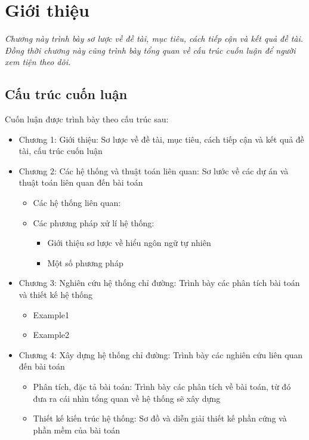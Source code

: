 \chapter{Giới thiệu}
\label{Chapter1}

\emph{Chương này trình bày sơ lược về đề tài, mục tiêu, cách tiếp cận và kết quả đề tài. Đồng thời chương này cũng trình bày tổng quan về cấu trúc cuốn luận để người xem tiện theo dõi.}
\section{Cấu trúc cuốn luận}
Cuốn luận được trình bày theo cấu trúc sau:
\begin{itemize}
    \item Chương 1: Giới thiệu: Sơ lược về đề tài, mục tiêu, cách tiếp cận và kết quả đề tài, cấu trúc cuốn luận
    \item Chương 2: Các hệ thống và thuật toán liên quan: Sơ lước về các dự án và thuật toán liên quan đến bài toán
          \begin{itemize}
              \item Các hệ thống liên quan:
              \item Các phương pháp xử lí hệ thống:
                    \begin{itemize}
                        \item Giới thiệu sơ lược về hiểu ngôn ngữ tự nhiên
                        \item Một số phương pháp
                    \end{itemize}
          \end{itemize}
    \item Chương 3: Nghiên cứu hệ thống chỉ đường: Trình bày các phân tích bài toán và thiết kế hệ thống
          \begin{itemize}
              \item Example1
              \item Example2
          \end{itemize}
    \item Chương 4: Xây dựng hệ thống chỉ đường: Trình bày các nghiên cứu liên quan đến bài toán
          \begin{itemize}
              \item Phân tích, đặc tả bài toán: Trình bày các phân tích về bài toán, từ đó đưa ra cái nhìn tổng quan về hệ thống sẽ xây dựng
              \item Thiết kế kiến trúc hệ thống: Sơ đồ và diễn giải thiết kế phần cứng và phần mềm của bài toán

\end{itemize}
\end{itemize}
